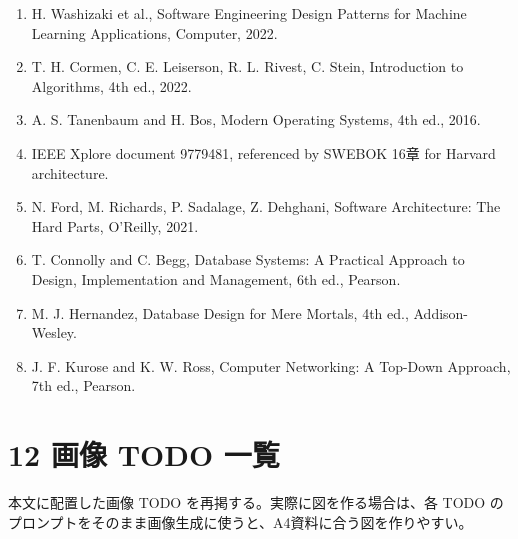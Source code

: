 \documentclass[a4paper,11pt]{ltjsarticle}
\begin{document}
\begin{enumerate}[leftmargin=2em]
\item H. Washizaki et al., Software Engineering Design Patterns for Machine Learning Applications, Computer, 2022.
\item T. H. Cormen, C. E. Leiserson, R. L. Rivest, C. Stein, Introduction to Algorithms, 4th ed., 2022.
\item A. S. Tanenbaum and H. Bos, Modern Operating Systems, 4th ed., 2016.
\item IEEE Xplore document 9779481, referenced by SWEBOK 16章 for Harvard architecture.
\item N. Ford, M. Richards, P. Sadalage, Z. Dehghani, Software Architecture: The Hard Parts, O'Reilly, 2021.
\item T. Connolly and C. Begg, Database Systems: A Practical Approach to Design, Implementation and Management, 6th ed., Pearson.
\item M. J. Hernandez, Database Design for Mere Mortals, 4th ed., Addison-Wesley.
\item J. F. Kurose and K. W. Ross, Computer Networking: A Top-Down Approach, 7th ed., Pearson.
\end{enumerate}

\section{12 画像 TODO 一覧}

本文に配置した画像 TODO を再掲する。実際に図を作る場合は、各 TODO のプロンプトをそのまま画像生成に使うと、A4資料に合う図を作りやすい。
\end{document}
